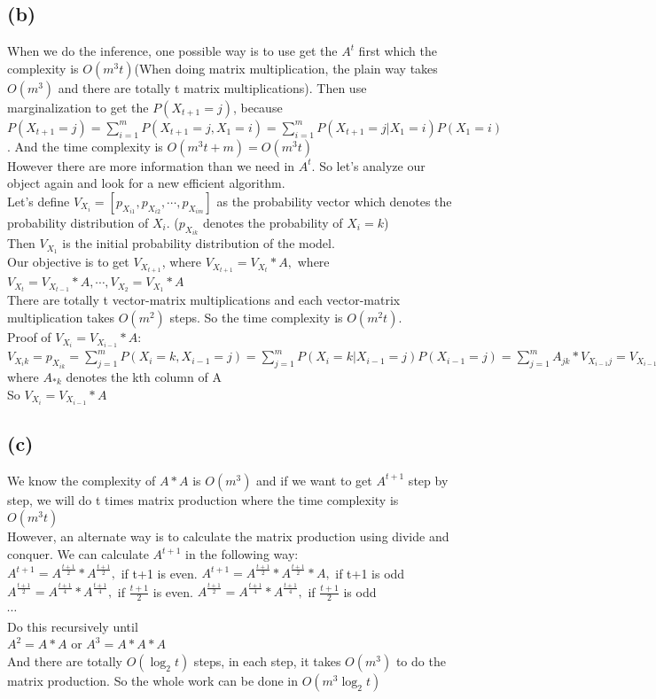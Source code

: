 \documentclass [11pt, a4paper, oneside] {article}
\begin{document}
\subsection *{(b)}
When we do the inference, one possible way is to use get the $A^t$ first which the complexity is $O(m^3t)$(When doing matrix multiplication, the plain way takes 
$O(m^3)$ and there are totally t matrix multiplications). Then use marginalization to get the $P(X_{t+1}=j)$,  because $P(X_{t+1}=j) = \sum\limits_{i=1}^{m}P(X_{t+1}=j, X_1=i) = 
\sum\limits_{i=1}^{m}P(X_{t+1}=j|X_1=i)P(X_1=i)$. And the time complexity is $O(m^3t+m) = O(m^3t)$\\
However there are more information than we need in $A^t$. So let's analyze our object again and look for a new efficient algorithm. \\
Let's define $V_{X_i} = [p_{X_{i1}}, p_{X_{i2}}, \cdots, p_{X_{im}}]$ as the probability vector which denotes the probability distribution of $X_i$. ($p_{X_{ik}}$ denotes the probability of $X_{i} = k$)\\
Then $V_{X_1}$ is the initial probability distribution of the model.\\
Our objective is to get $V_{X_{t+1}}$, where $V_{X_{t+1}} = V_{X_{t}}*A,$ where $V_{X_{t}} = V_{X_{t-1}}*A, \cdots, V_{X_{2}} = V_{X_{1}}*A$\\
There are totally t vector-matrix multiplications and each vector-matrix multiplication takes $O(m^2)$ steps. So the time complexity is $O(m^2t).$\\
Proof of $V_{X_{i}} = V_{X_{i-1}}*A$:\\
$V_{X_{i}k} =  p_{X_{ik}} = \sum\limits_{j=1}^{m}P(X_{i}=k, X_{i-1}=j) = \sum\limits_{j=1}^{m}P(X_{i}=k|X_{i-1}=j)P(X_{i-1}=j) = \sum\limits_{j=1}^{m}A_{jk}*V_{X_{i-1}j} = 
V_{X_{i-1}}*A_{*k}$ where $A_{*k}$ denotes the kth column of A\\
So $V_{X_{i}} = V_{X_{i-1}}*A$\\
\subsection *{(c)}
We know the complexity of $A*A$ is $O(m^3)$ and if we want to get $A^{t+1}$ step by step, we will do t times matrix production where the time complexity is $O(m^3t)$\\
However, an alternate way is to calculate the matrix production using divide and conquer. We can calculate $A^{t+1}$ in the following way:\\
$A^{t+1} = A^{\frac{t+1}{2}}*A^{\frac{t+1}{2}}, $ if t+1 is even. $A^{t+1} = A^{\frac{t+1}{2}}*A^{\frac{t+1}{2}}*A, $ if t+1 is odd\\
$A^{\frac{t+1}{2}} = A^{\frac{t+1}{4}}*A^{\frac{t+1}{4}}, $ if $\frac{t+1}{2}$ is even. $A^{\frac{t+1}{2}} = A^{\frac{t+1}{4}}*A^{\frac{t+1}{4}}, $ if $\frac{t+1}{2}$ is odd\\
$\cdots$\\
Do this recursively until \\
$A^{2} = A*A$ or $A^{3} = A*A*A$\\
And there are totally $O(\log_2t)$ steps, in each step, it takes $O(m^3)$ to do the matrix production. So the whole work can be done in $O(m^3\log_2t)$\\
\end{document}
